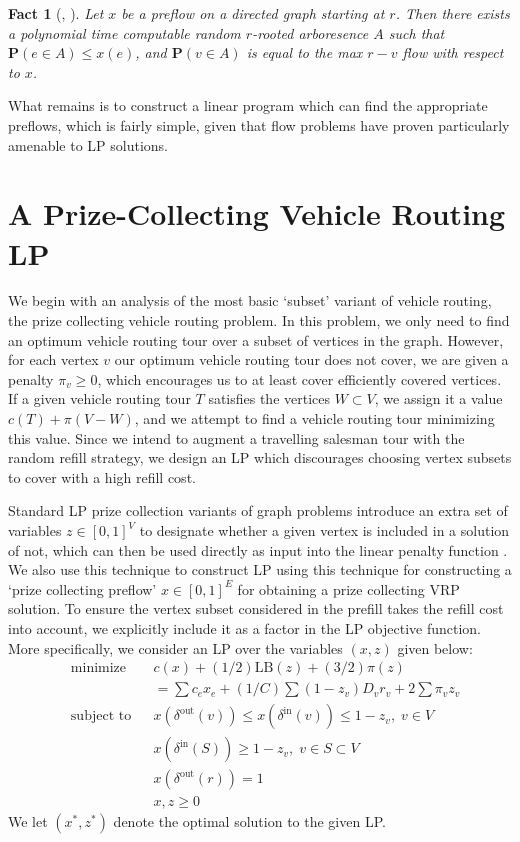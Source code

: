 \documentclass{article}
\theoremstyle{plain}
\newtheorem*{fact}{Fact}
\theoremstyle{plain}
\begin{document}
\begin{fact}[\cite{FlowToTreeResult}, \cite{FlowToTreePolyTimeResult}]
    Let $x$ be a preflow on a directed graph starting at $r$. Then there exists a polynomial time computable random $r$-rooted arboresence $A$ such that $\mathbf{P}(e \in A) \leq x(e)$, and $\mathbf{P}(v \in A)$ is equal to the max $r-v$ flow with respect to $x$.
\end{fact}

What remains is to construct a linear program which can find the appropriate preflows, which is fairly simple, given that flow problems have proven particularly amenable to LP solutions.

\section{A Prize-Collecting Vehicle Routing LP}

We begin with an analysis of the most basic `subset' variant of vehicle routing, the prize collecting vehicle routing problem. In this problem, we only need to find an optimum vehicle routing tour over a subset of vertices in the graph. However, for each vertex $v$ our optimum vehicle routing tour does not cover, we are given a penalty $\pi_v \geq 0$, which encourages us to at least cover efficiently covered vertices. If a given vehicle routing tour $T$ satisfies the vertices $W \subset V$, we assign it a value $c(T) + \pi(V - W)$, and we attempt to find a vehicle routing tour minimizing this value. Since we intend to augment a travelling salesman tour with the random refill strategy, we design an LP which discourages choosing vertex subsets to cover with a high refill cost.

Standard LP prize collection variants of graph problems introduce an extra set of variables $z \in [0,1]^V$ to designate whether a given vertex is included in a solution of not, which can then be used directly as input into the linear penalty function \cite{MSTLPApprox}. We also use this technique to construct LP using this technique for constructing a `prize collecting preflow' $x \in [0,1]^E$ for obtaining a prize collecting VRP solution. To ensure the vertex subset considered in the prefill takes the refill cost into account, we explicitly include it as a factor in the LP objective function. More specifically, we consider an LP over the variables $(x,z)$ given below:
%
\begin{equation*}
\begin{aligned}
& \text{minimize}
& & c(x) + (1/2) \text{LB}(z) + (3/2) \pi(z)\\
& & & = \sum c_ex_e + (1/C) \sum (1 - z_v) D_vr_v + 2\sum \pi_v z_v \\
& \text{subject to} & & x(\delta^{\text{out}}(v)) \leq x(\delta^{\text{in}}(v)) \leq 1 - z_v, \; v \in V\\
& & & x(\delta^{\text{in}}(S)) \geq 1 - z_v, \; v \in S \subset V\\
& & & x(\delta^{\text{out}}(r)) = 1\\
& & & x,z \geq 0
\end{aligned}
\end{equation*}
%
We let $(x^*,z^*)$ denote the optimal solution to the given LP.
\end{document}
